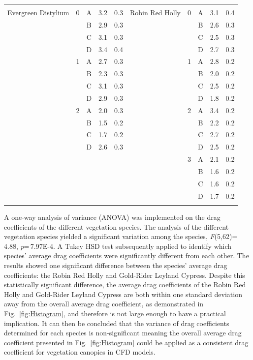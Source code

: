 \documentclass[12pt]{article}
\begin{document}
\begin{table}
\begin{tabular}{cccccccccc}
					&		&		& 		&					&				&		&		& 		&		\\
Evergreen Distylium			&	0	&	A	& 	3.2	&	0.3				&Robin Red Holly		&	0	&	A	& 	3.1	&	0.4	\\
					&		&	B	& 	2.9	&	0.3				&				&		&	B	& 	2.6	&	0.3	\\
					&		&	C	& 	3.1	&	0.3				&				&		&	C	& 	2.5	&	0.3	\\
					&		&	D	& 	3.4	&	0.4				&				&		&	D	& 	2.7	&	0.3	\\
					&	1	&	A	& 	2.7	&	0.3				&				&	1	&	A	& 	2.8	&	0.2	\\
					&		&	B	& 	2.3	&	0.3				&				&		&	B	& 	2.0	&	0.2	\\
					&		&	C	& 	3.1	&	0.3				&				&		&	C	& 	2.5	&	0.2	\\
					&		&	D	& 	2.9	&	0.3				&				&		&	D	& 	1.8	&	0.2	\\
					&	2	&	A	& 	2.0	&	0.3				&				&	2	&	A	& 	3.4	&	0.2	\\
					&		&	B	& 	1.5	&	0.2				&				&		&	B	& 	2.2	&	0.2	\\
					&		&	C	& 	1.7	&	0.2				&				&		&	C	& 	2.7	&	0.2	\\
					&		&	D	& 	2.6	&	0.3				&				&		&	D	& 	2.5	&	0.2	\\
					&		&		& 		&					&				&	3	&	A	& 	2.1	&	0.2	\\
					&		&		& 		&					&				&		&	B	& 	1.6	&	0.2	\\
					&		&		& 		&					&				&		&	C	& 	1.6	&	0.2	\\
					&		&		& 		&					&				&		&	D	& 	1.7	&	0.2	\\
\\[0.05cm]
\hline														

\end{tabular}
\end{table}

A one-way analysis of variance (ANOVA) was implemented on the drag coefficients of the different vegetation species. The analysis of the different vegetation species yielded a significant variation among the species, \textit{F}(5,62)=\,4.88, \textit{p}=\,7.97E-4. A Tukey HSD test subsequently applied to identify which species' average drag coefficients were significantly different from each other. The results showed one significant difference between the species' average drag coefficients: the Robin Red Holly and Gold-Rider Leyland Cypress. Despite this statistically significant difference, the average drag coefficients of the Robin Red Holly and Gold-Rider Leyland Cypress are both within one standard deviation away from the overall average drag coefficient, as demonstrated in Fig.~\ref{fig:Histogram},  and therefore is not large enough to have a practical implication. It can then be concluded that the variance of drag coefficients determined for each species is non-significant meaning the overall average drag coefficient presented in Fig.~\ref{fig:Histogram} could be applied as a consistent drag coefficient for vegetation canopies in CFD models.
\end{document}
